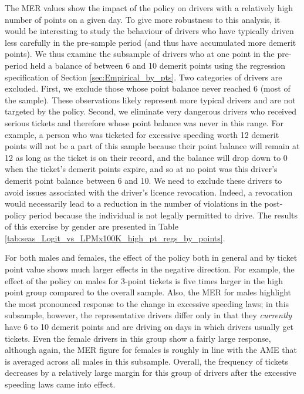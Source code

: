 \documentclass{cje}
\begin{document}
The MER values show the impact of the policy on drivers with a relatively high number of points on a given day. To give more robustness to this analysis, it would be interesting to study the behaviour of drivers who have typically driven less carefully in the pre-sample period
(and thus have accumulated more demerit points). 
We thus examine the subsample of drivers who at one point in the pre-period 
held a balance of between 6 and 10 demerit points 
using the regression specification of 
Section \ref{sec:Empirical_by_pts}. 
Two categories of drivers are excluded. First, we exclude 
those whose point balance never reached 6 (most of the sample). These observations likely represent more typical drivers and are not targeted by the policy. Second, we eliminate very dangerous drivers who received serious tickets and therefore whose point balance was never in this range.
For example, a person who was ticketed for excessive speeding worth 12 demerit points 
will not be a part of this sample because their point balance will remain at 12 
as long as the ticket is on their record, 
and the balance will drop down to 0 when the ticket’s demerit points expire, and so at no point was this driver’s demerit point balance between 6 and 10. 
We need to exclude these drivers to avoid issues associated with the driver’s licence revocation. 
Indeed, a revocation would necessarily lead to a reduction in the number of violations 
in the post-policy period because the individual is not legally permitted to drive. 
The results of this exercise by gender are presented in 
Table \ref{tab:seas_Logit_vs_LPMx100K_high_pt_regs_by_points}. 

For both males and females, 
the effect of the policy both in general and by ticket point value 
shows much larger effects in the negative direction. 
For example, the effect of the policy on males for 3-point tickets is five times larger 
in the high point group compared to the overall sample. 
% 
Also, the MER for males highlight the most pronounced response to the
change in excessive speeding laws; 
in this subsample, however, the representative drivers differ only 
in that they \emph{currently} have 6 to 10 demerit points 
and are driving on days in which drivers usually get tickets.  
% 
Even the female drivers in this group show a fairly large response, 
although again, the MER figure for females is roughly in line with 
the AME that is averaged across all males in this subsample. 
% 
Overall, the frequency of tickets decreases by a relatively large margin 
for this group of drivers after the excessive speeding laws came into effect.
\end{document}
